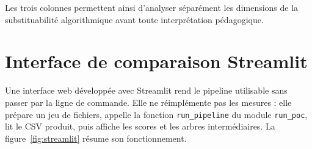 \documentclass[12pt,a4paper,oneside]{report}
\begin{document}
Les trois colonnes permettent ainsi d'analyser séparément les dimensions de la
substituabilité algorithmique avant toute interprétation pédagogique.

\section{Interface de comparaison Streamlit}

Une interface web développée avec Streamlit rend le pipeline utilisable sans
passer par la ligne de commande. Elle ne réimplémente pas les mesures : elle
prépare un jeu de fichiers, appelle la fonction \texttt{run\_pipeline} du
module \texttt{run\_poc}, lit le CSV produit, puis affiche les scores et les
arbres intermédiaires. La figure~\ref{fig:streamlit} résume son
fonctionnement.
\end{document}
